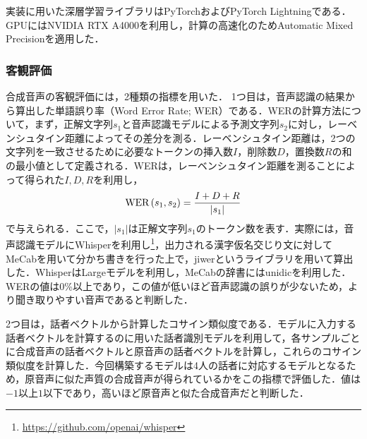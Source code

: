 実装に用いた深層学習ライブラリはPyTorchおよびPyTorch Lightningである．GPUにはNVIDIA RTX A4000を利用し，計算の高速化のためAutomatic Mixed Precisionを適用した．

\subsubsection{客観評価}
合成音声の客観評価には，2種類の指標を用いた．
1つ目は，音声認識の結果から算出した単語誤り率（Word Error Rate; WER）である．WERの計算方法について，まず，正解文字列$s_{1}$と音声認識モデルによる予測文字列$s_{2}$に対し，レーベンシュタイン距離によってその差分を測る．レーベンシュタイン距離は，2つの文字列を一致させるために必要なトークンの挿入数$I$，削除数$D$，置換数$R$の和の最小値として定義される．WERは，レーベンシュタイン距離を測ることによって得られた$I, D, R$を利用し，
\begin{equation}
    \text{WER}\left(s_{1}, s_{2}\right) = \frac{I + D + R}{|s_{1}|}
\end{equation}
で与えられる．ここで，$|s_{1}|$は正解文字列$s_{1}$のトークン数を表す．実際には，音声認識モデルにWhisper\cite{radford2023robust}を利用し\footnote{\url{https://github.com/openai/whisper}}，出力される漢字仮名交じり文に対してMeCabを用いて分かち書きを行った上で，jiwerというライブラリを用いて算出した．WhisperはLargeモデルを利用し，MeCabの辞書にはunidicを利用した．WERの値は0\%以上であり，この値が低いほど音声認識の誤りが少ないため，より聞き取りやすい音声であると判断した．

2つ目は，話者ベクトルから計算したコサイン類似度である．モデルに入力する話者ベクトルを計算するのに用いた話者識別モデルを利用して，各サンプルごとに合成音声の話者ベクトルと原音声の話者ベクトルを計算し，これらのコサイン類似度を計算した．今回構築するモデルは4人の話者に対応するモデルとなるため，原音声に似た声質の合成音声が得られているかをこの指標で評価した．値は$-1$以上$1$以下であり，高いほど原音声と似た合成音声だと判断した．

